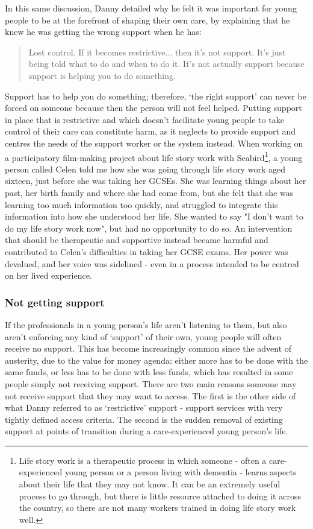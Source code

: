 In this same discussion, Danny detailed why he felt it was important for young people to be at the forefront of shaping their own care, by explaining that he knew he was getting the wrong support when he has:
\begin{quote}
Lost control. If it becomes restrictive... then it's not support. It's just being told what to do and when to do it. It's not actually support because support is helping you to do something.
\end{quote}
Support has to help you do something; therefore, `the right support' can never be forced on someone because then the person will not feel helped. Putting support in place that is restrictive and which doesn't facilitate young people to take control of their care can constitute harm, as it neglects to provide support and centres the needs of the support worker or the system instead.  When working on a participatory film-making project about life story work with Seabird\footnote{Life story work is a therapeutic process in which someone - often a care-experienced young person or a person living with dementia - learns aspects about their life that they may not know. It can be an extremely useful process to go through, but there is little resource attached to doing it across the country, so there are not many workers trained in doing life story work well.}, a young person called Celen told me how she was going through life story work aged sixteen, just before she was taking her GCSEs. She was learning things about her past, her birth family and where she had come from, but she felt that she was learning too much information too quickly, and struggled to integrate this information into how she understood her life. She wanted to say "I don't want to do my life story work now", but had no opportunity to do so. An intervention that should be therapeutic and supportive instead became harmful and contributed to Celen’s difficulties in taking her GCSE exams. Her power was devalued, and her voice was sidelined - even in a process intended to be centred on her lived experience.

\subsubsection{Not getting support}
If the professionals in a young person's life aren't listening to them, but also aren’t enforcing any kind of `support' of their own, young people will often receive no support. This has become increasingly common since the advent of austerity, due to the value for money agenda: either more has to be done with the same funds, or less has to be done with less funds, which has resulted in some people simply not receiving support. There are two main reasons someone may not receive support that they may want to access. The first is the other side of what Danny referred to as `restrictive' support - support services with very tightly defined access criteria. The second is the sudden removal of existing support at points of transition during a care-experienced young person's life.

